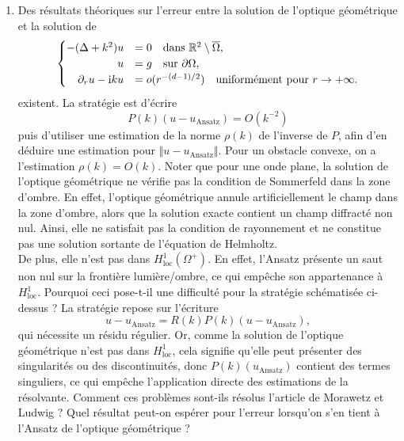 \documentclass{article}
\begin{document}
\begin{enumerate}
    \item {\color{black}Des résultats théoriques sur l'erreur entre la solution de l'optique géométrique et la solution de
    \[
    \begin{cases}
    -(\Delta + k^2) u &= 0 \quad \text{dans } \mathbb{R}^2 \setminus \overline{\Omega}, \\
    \hfill u &= g \quad \text{sur } \partial \Omega, \\
    \hfill \partial_r u - \mathrm{i} k u &= o(r^{-(d-1)/2}) \quad \text{uniformément pour } r \to +\infty.
    \end{cases}
    \]
    existent. La stratégie est d'écrire
    \[
    P(k)(u - u_\mathrm{Ansatz}) = O(k^{-2})
    \]
    puis d'utiliser une estimation de la norme $\rho(k)$ de l'inverse de $P$, afin d'en déduire une estimation pour $\Vert u - u_\mathrm{Ansatz} \Vert$. Pour un obstacle convexe, on a l'estimation $\rho(k) = O(k)$. Noter que pour une onde plane, la solution de l'optique géométrique ne vérifie pas la condition de Sommerfeld dans la zone d'ombre. {\color{blue}En effet, l'optique géométrique annule artificiellement le champ dans la zone d'ombre, alors que la solution exacte contient un champ diffracté non nul. Ainsi, elle ne satisfait pas la condition de rayonnement et ne constitue pas une solution sortante de l’équation de Helmholtz.} \\
    De plus, elle n'est pas dans $H^1_\mathrm{loc}(\Omega^+)$.} {\color{blue}En effet, l’Ansatz présente un saut non nul sur la frontière lumière/ombre, ce qui empêche son appartenance à $H^1_\mathrm{loc}$.} {\color{black}Pourquoi ceci pose-t-il une difficulté pour la stratégie schématisée ci-dessus ?} {\color{blue}La stratégie repose sur l’écriture $$u-u_{\mathrm{Ansatz}} = R(k)P(k)(u-u_{\mathrm{Ansatz}}),$$ qui nécessite un résidu régulier. Or, comme la solution de l'optique géométrique n'est pas dans $H^1_\mathrm{loc}$, cela signifie qu'elle peut présenter des singularités ou des discontinuités, donc $P(k)(u_{\mathrm{Ansatz}})$ contient des termes singuliers, ce qui empêche l’application directe des estimations de la résolvante.} {\color{black} Comment ces problèmes sont-ils résolus l'article de Morawetz et Ludwig ?} {\color{black} Quel résultat peut-on espérer pour l'erreur lorsqu'on s'en tient à l'Ansatz de l'optique géométrique ?} %
    

\end{enumerate}
\end{document}

